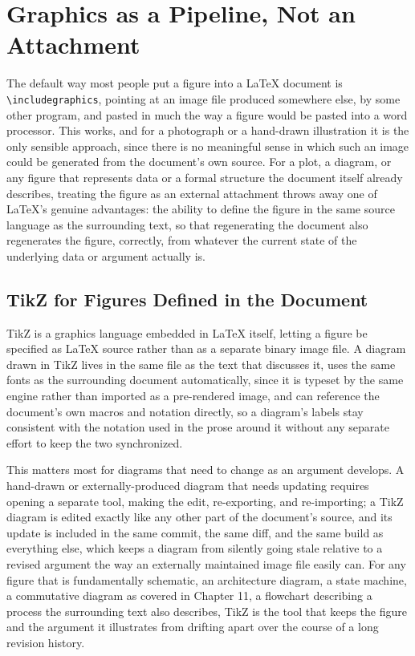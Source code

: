 \hypertarget{chapter-14-graphics-as-a-pipeline-not-an-attachment}{%
\chapter{Graphics as a Pipeline, Not an Attachment}\label{chapter-14-graphics-as-a-pipeline-not-an-attachment}}

The default way most people put a figure into a LaTeX document is \texttt{\textbackslash{}includegraphics}, pointing at an image file produced somewhere else, by some other program, and pasted in much the way a figure would be pasted into a word processor. This works, and for a photograph or a hand-drawn illustration it is the only sensible approach, since there is no meaningful sense in which such an image could be generated from the document's own source. For a plot, a diagram, or any figure that represents data or a formal structure the document itself already describes, treating the figure as an external attachment throws away one of LaTeX's genuine advantages: the ability to define the figure in the same source language as the surrounding text, so that regenerating the document also regenerates the figure, correctly, from whatever the current state of the underlying data or argument actually is.

\hypertarget{tikz-for-figures-defined-in-the-document}{%
\section{TikZ for Figures Defined in the Document}\label{tikz-for-figures-defined-in-the-document}}

TikZ is a graphics language embedded in LaTeX itself, letting a figure be specified as LaTeX source rather than as a separate binary image file. A diagram drawn in TikZ lives in the same file as the text that discusses it, uses the same fonts as the surrounding document automatically, since it is typeset by the same engine rather than imported as a pre-rendered image, and can reference the document's own macros and notation directly, so a diagram's labels stay consistent with the notation used in the prose around it without any separate effort to keep the two synchronized.

This matters most for diagrams that need to change as an argument develops. A hand-drawn or externally-produced diagram that needs updating requires opening a separate tool, making the edit, re-exporting, and re-importing; a TikZ diagram is edited exactly like any other part of the document's source, and its update is included in the same commit, the same diff, and the same build as everything else, which keeps a diagram from silently going stale relative to a revised argument the way an externally maintained image file easily can. For any figure that is fundamentally schematic, an architecture diagram, a state machine, a commutative diagram as covered in Chapter 11, a flowchart describing a process the surrounding text also describes, TikZ is the tool that keeps the figure and the argument it illustrates from drifting apart over the course of a long revision history.

